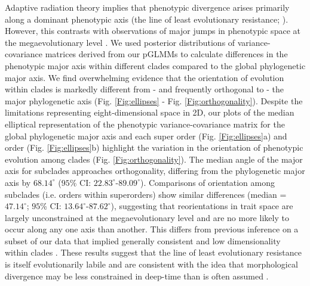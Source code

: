 \documentclass[12pt,letterpaper]{article}
\begin{document}
Adaptive radiation theory implies that phenotypic divergence arises primarily along a dominant phenotypic axis (the line of least evolutionary resistance; \cite{marroig2005size}).
However, this contrasts with observations of major jumps in phenotypic space at the megaevolutionary level \cite{puttick2014high,cooney2017mega,venditti2011multiple}.
We used posterior distributions of variance-covariance matrices derived from our pGLMMs to calculate differences in the phenotypic major axis within different clades compared to the global phylogenetic major axis.
We find overwhelming evidence that the orientation of evolution within clades is markedly different from - and frequently orthogonal to - the major phylogenetic axis (Fig. \ref{Fig:ellipses} - Fig. \ref{Fig:orthogonality}).
Despite the limitations representing eight-dimensional space in 2D, our plots of the median elliptical representation of the phenotypic variance-covariance matrix for the global phylogenetic major axis and each super order (Fig. \ref{Fig:ellipses}a) and order (Fig. \ref{Fig:ellipses}b) highlight the variation in the orientation of phenotypic evolution among clades (Fig. \ref{Fig:orthogonality}).
The median angle of the major axis for subclades approaches orthogonality, differing from the phylogenetic major axis by $68.14^\circ$ ($95$\% CI: $22.83^\circ$-$89.09^\circ$).
Comparisons of orientation among subclades (i.e. orders within superorders) show similar differences (median = $47.14^\circ$; $95$\% CI: $13.64^\circ$-$87.62^\circ$), suggesting that reorientations in trait space are largely unconstrained at the megaevolutionary level and are no more likely to occur along any one axis than another.
This differs from previous inference on a subset of our data that implied generally consistent and low dimensionality within clades \cite{cooney2017mega}.
These results suggest that the line of least evolutionary resistance is itself evolutionarily labile and are consistent with the idea that morphological divergence may be less constrained in deep-time than is often assumed \cite{venditti2011multiple}.
\end{document}
